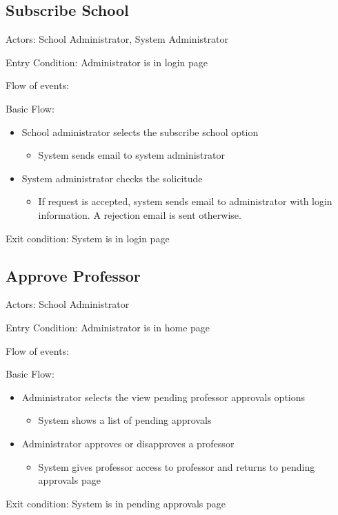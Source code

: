 \subsection*{Subscribe School}
Actors: School Administrator, System Administrator

Entry Condition: Administrator is in login page

Flow of events:

Basic Flow:

\begin{itemize}
\item School administrator selects the subscribe school option
\begin{itemize}
\item System sends email to system administrator
\end{itemize}
\item System administrator checks the solicitude
\begin{itemize}
\item If request is accepted, system sends email to administrator with 
login information. A rejection email is sent otherwise.
\end{itemize}
\end{itemize}
Exit condition: System is in login page

\subsection*{Approve Professor}
Actors: School Administrator

Entry Condition: Administrator is in home page

Flow of events:

Basic Flow:

\begin{itemize}
\item Administrator selects the view pending professor approvals options
\begin{itemize}
\item System shows a list of pending approvals
\end{itemize}
\item Administrator approves or disapproves a professor
\begin{itemize}
\item System gives professor access to professor and returns to 
pending approvals page
\end{itemize}
\end{itemize}
Exit condition: System is in pending approvals page



